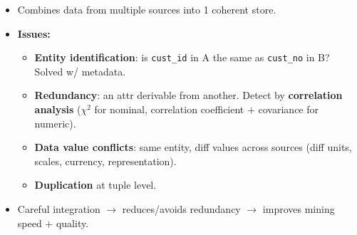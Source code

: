 \vspace{2pt}
\begin{center}\end{center}

{\color{sub}\footnotesize {}}

\begin{itemize}
  \item Combines data from multiple sources into 1 coherent store.
  \item \textbf{Issues:}
  \begin{itemize}
    \item \textbf{Entity identification}: is \texttt{cust\_id} in A the same as \texttt{cust\_no} in B?
          Solved w/ metadata.
    \item \textbf{Redundancy}: an attr derivable from another. Detect by \textbf{correlation analysis}
          ($\chi^2$ for nominal, correlation coefficient $+$ covariance for numeric).
    \item \textbf{Data value conflicts}: same entity, diff values across sources
          (diff units, scales, currency, representation).
    \item \textbf{Duplication} at tuple level.
  \end{itemize}
  \item Careful integration $\rightarrow$ reduces/avoids redundancy $\rightarrow$ improves mining speed + quality.
\end{itemize}

